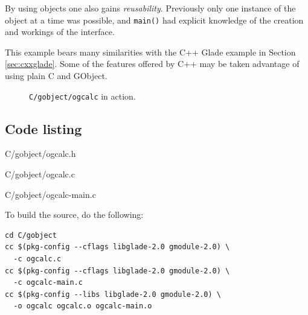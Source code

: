 \documentclass[a4paper,oneside]{article}
\newcommand{\filename}[1]{\texttt{#1}}
\newcommand{\program}[1]{\texttt{#1}}
\newcommand{\function}[1]{\texttt{#1()}}
\begin{document}
By using objects one also gains \emph{reusability}.  Previously only
one instance of the object at a time was possible, and \function{main}
had explicit knowledge of the creation and workings of the interface.

This example bears many similarities with the C++ Glade example in
Section \ref{sec:cxxglade}.  Some of the features offered by C++ may
be taken advantage of using plain C and GObject.

\begin{figure}
  \centering
  \caption[\program{C/gobject/ogcalc} in action]{\program{C/gobject/ogcalc} in
    action.}
  \label{fig:ogcalcgo}
\end{figure}

\subsection{Code listing}


                 {C/gobject/ogcalc.h}


                 {C/gobject/ogcalc.c}


                 {C/gobject/ogcalc-main.c}

To build the source, do the following:

\begin{verbatim}
cd C/gobject
cc $(pkg-config --cflags libglade-2.0 gmodule-2.0) \
  -c ogcalc.c
cc $(pkg-config --cflags libglade-2.0 gmodule-2.0) \
  -c ogcalc-main.c
cc $(pkg-config --libs libglade-2.0 gmodule-2.0) \
  -o ogcalc ogcalc.o ogcalc-main.o
\end{verbatim}
\end{document}
